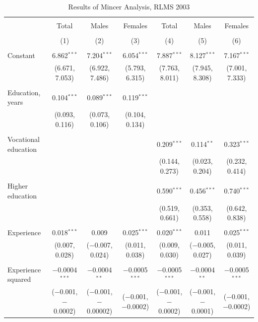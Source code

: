 \documentclass[12pt,a4paper]{article}
\numberwithin{equation}{section}
\begin{document}
\begin{landscape}
	
	\fontsize{9}{11}
	\selectfont
	
	\begin{table}[!htbp] \centering 
		\caption{Results of Mincer Analysis, RLMS 2003} 
		\label{} 
		\begin{tabular}{@{\extracolsep{5pt}}lcccccc} 
			\\[-1.8ex]\hline 
			\hline \\[-1.8ex] 
			& Total & Males & Females & Total & Males & Females \\ 
			\\[-1.8ex] & (1) & (2) & (3) & (4) & (5) & (6)\\ 
			\hline \\[-1.8ex] 
			Constant & 6.862$^{***}$ & 7.204$^{***}$ & 6.054$^{***}$ & 7.887$^{***}$ & 8.127$^{***}$ & 7.167$^{***}$ \\ 
			& (6.671, 7.053) & (6.922, 7.486) & (5.793, 6.315) & (7.763, 8.011) & (7.945, 8.308) & (7.001, 7.333) \\ 
			& & & & & & \\ 
			Education, years & 0.104$^{***}$ & 0.089$^{***}$ & 0.119$^{***}$ &  &  &  \\ 
			& (0.093, 0.116) & (0.073, 0.106) & (0.104, 0.134) &  &  &  \\ 
			& & & & & & \\ 
			Vocational education &  &  &  & 0.209$^{***}$ & 0.114$^{**}$ & 0.323$^{***}$ \\ 
			&  &  &  & (0.144, 0.273) & (0.023, 0.204) & (0.232, 0.414) \\ 
			& & & & & & \\ 
			Higher education &  &  &  & 0.590$^{***}$ & 0.456$^{***}$ & 0.740$^{***}$ \\ 
			&  &  &  & (0.519, 0.661) & (0.353, 0.558) & (0.642, 0.838) \\ 
			& & & & & & \\ 
			Experience & 0.018$^{***}$ & 0.009 & 0.025$^{***}$ & 0.020$^{***}$ & 0.011 & 0.025$^{***}$ \\ 
			& (0.007, 0.028) & ($-$0.007, 0.024) & (0.011, 0.038) & (0.009, 0.030) & ($-$0.005, 0.027) & (0.011, 0.039) \\ 
			& & & & & & \\ 
			Experience squared & $-$0.0004$^{***}$ & $-$0.0004$^{**}$ & $-$0.0005$^{***}$ & $-$0.0005$^{***}$ & $-$0.0004$^{**}$ & $-$0.0005$^{***}$ \\ 
			& ($-$0.001, $-$0.0002) & ($-$0.001, $-$0.00002) & ($-$0.001, $-$0.0002) & ($-$0.001, $-$0.0002) & ($-$0.001, $-$0.0001) & ($-$0.001, $-$0.0002) \\ 

\end{tabular}
\end{table}
\end{landscape}
\end{document}
